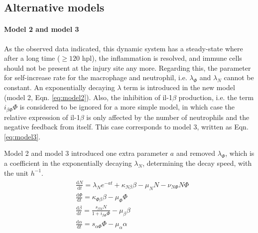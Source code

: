 \subsection{Alternative models}

\paragraph{Model 2 and model 3}

As the observed data indicated, this dynamic system has a steady-state where after a long time ($\geq 120$ hpl), the inflammation is resolved, and immune cells should not be present at the injury site any more. Regarding this, the parameter for self-increase rate for the macrophage and neutrophil, i.e. $\lambda_\Phi$ and $\lambda_N$  cannot be constant. An exponentially decaying $\lambda$ term is introduced in the new model (model 2, Eqn. \ref{eq:model2}). Also, the inhibition of il-1$\beta$ production, i.e. the term $i_{\beta\Phi}\Phi$ is considered to be ignored for a more simple model, in which case the relative expression of il-1$\beta$ is only affected by the number of neutrophils and the negative feedback from itself. This case corresponds to model 3, written as Eqn. \ref{eq:model3}.

Model 2 and model 3 introduced one extra parameter $a$ and removed $\lambda_\Phi$, which is a coefficient in the exponentially decaying $\lambda_N$, determining the decay speed, with the unit $h^{-1}$.
\begin{align}
    \label{eq:model2}
    \begin{split}
        &\frac{\mathrm{d} N}{\mathrm{d} t}=\lambda_Ne^{-at}+\kappa_{N\beta}\beta-\mu_NN-\nu_{N\Phi}N\Phi\\
        &\frac{\mathrm{d} \Phi}{\mathrm{d} t}=\kappa_{\Phi\beta}\beta-\mu_\Phi\Phi\\
        &\frac{\mathrm{d} \beta}{\mathrm{d} t}=\frac{s_{\beta N}N}{1+i_{\beta\Phi}\Phi}-\mu_\beta\beta\\
        &\frac{\mathrm{d} \alpha}{\mathrm{d} t}=s_{\alpha\Phi}\Phi-\mu_\alpha\alpha
    \end{split}
\end{align}

